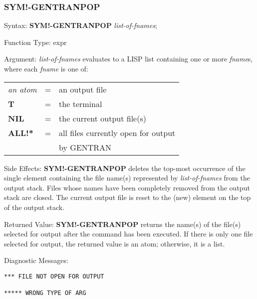 \subsubsection{SYM!-GENTRANPOP} 
\begin{describe}{Syntax:}
{\bf SYM!-GENTRANPOP} {\it list-of-fnames\/};
\end{describe} 
\begin{describe}{Function Type:}
expr
\end{describe} 
\begin{describe}{Argument:}
{\it list-of-fnames\/} evaluates to a LISP list containing one or more
{\it fname\/}s, where each {\it fname\/} is one of:

\begin{tabular}{lll}
{\it an atom} & = &  an output file\\
{\bf T} & = & the terminal\\
{\bf NIL} & = & the current output file(s)\\
{\bf ALL!*} & = & all files currently open for output \\
& & by GENTRAN\\
\end{tabular}
\end{describe} 
\begin{describe}{Side Effects:}
{\bf SYM!-GENTRANPOP} deletes the top-most occurrence of the
single element containing the file name(s) represented by
{\it list-of-fnames\/} from the output stack.  Files whose names have been
completely removed from the output stack are closed.  The current output file
is reset to the (new) element on the top of the output stack.
\end{describe} 
\begin{describe}{Returned Value:}
{\bf SYM!-GENTRANPOP} returns the name(s) of the file(s)
selected for output after the command has been executed.  If there is
only one file selected for output, the returned value is an atom; otherwise,
it is a list.
\end{describe} 
\begin{describe}{Diagnostic Messages:}
\begin{verbatim}
*** FILE NOT OPEN FOR OUTPUT

***** WRONG TYPE OF ARG

\end{verbatim}
\end{describe}

